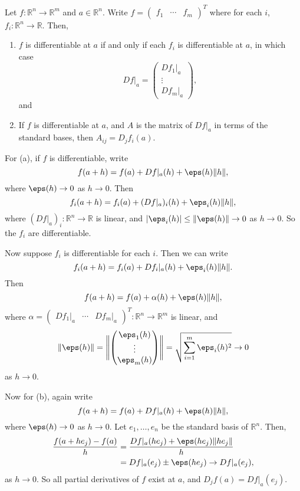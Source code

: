 \documentclass[12pt]{article}
\begin{document}
\begin{proposition}
	Let $f : \mathbb{R}^{n} \to \mathbb{R}^{m}$ and $a \in \mathbb{R}^{n}$. Write $f =
	\begin{pmatrix}
		f_1 & \cdots & f_m
	\end{pmatrix}^{T}$ where for each $i$, $f_i : \mathbb{R}^{n} \to \mathbb{R}$. Then,
	\begin{enumerate}[\normalfont(a)]
	\item $f$ is differentiable at $a$ if and only if each $f_i$ is differentiable at $a$, in which case
	\[
	Df|_a =
	\begin{pmatrix}
		Df_1|_a \\
		\vdots \\
		Df_m|_a
	\end{pmatrix}
	,\]
	and
	\item If $f$ is differentiable at $a$, and $A$ is the matrix of $Df|_a$ in terms of the standard bases, then $A_{ij} = D_j f_i(a)$.
	\end{enumerate}
\end{proposition}

\begin{proofbox}
	For (a), if $f$ is differentiable, write
	\[
	f(a+h) = f(a) + Df|_a(h) + \eps(h) \|h\|
	,\]
	where $\eps(h) \to 0$ as $h \to 0$. Then
	\[
	f_i(a+h) = f_i(a) + (Df|_a)_i(h) + \eps_i(h) \|h\|
	,\]
	where $(Df|_a)_i : \mathbb{R}^{n} \to \mathbb{R}$ is linear, and $|\eps_i(h)| \leq \|\eps(h)\| \to 0$ as $h \to 0$. So the $f_i$ are differentiable.

	Now suppose $f_i$ is differentiable for each $i$. Then we can write
	\[
	f_i(a+h) = f_i(a) + Df_i|_a(h) + \eps_i(h) \|h\|
	.\]
	Then
	\[
	f(a+h) = f(a) + \alpha(h) + \eps(h) \|h\|
	,\]
	where $\alpha =
	\begin{pmatrix}
		Df_1|_a & \cdots & Df_m|_a
	\end{pmatrix}^{T} : \mathbb{R}^{n} \to \mathbb{R}^{m}$ is linear, and
	\[
	\|\eps(h)\| = \Biggl\|
	\begin{pmatrix}
		\eps_1(h) \\
		\vdots \\
		\eps_m(h)
	\end{pmatrix}
	\Biggr\| = \sqrt{\sum_{i = 1}^{m} \eps_i(h)^2} \to 0
	\]
	as $h \to 0$.

	Now for (b), again write
	\[
	f(a + h) = f(a) + Df|_a(h) + \eps(h) \|h\|
	,\]
	where $\eps(h) \to 0$ as $h \to 0$. Let $e_1, \ldots, e_n$ be the standard basis of $\mathbb{R}^{n}$. Then,
	\begin{align*}
		\frac{f(a+he_j) - f(a)}{h} &= \frac{Df|_a(h e_j) + \eps(he_j) \|he_j\|}{h} \\
					   &= Df|_a(e_j) \pm \eps(h e_j) \to Df|_a(e_j),
	\end{align*}
	as $h \to 0$. So all partial derivatives of $f$ exist at $a$, and $D_jf(a) = Df|_a(e_j)$.
\end{proofbox}
\end{document}
